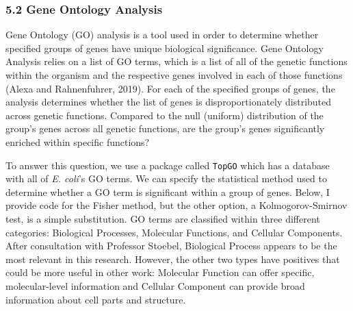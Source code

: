 \documentclass[]{article}
\begin{document}
\subsubsection{\texorpdfstring{\textbf{5.2} Gene Ontology
Analysis}{5.2 Gene Ontology Analysis}}\label{gene-ontology-analysis}

Gene Ontology (GO) analysis is a tool used in order to determine whether
specified groups of genes have unique biological significance. Gene
Ontology Analysis relies on a list of GO terms, which is a list of all
of the genetic functions within the organism and the respective genes
involved in each of those functions (Alexa and Rahnenfuhrer, 2019). For
each of the specified groups of genes, the analysis determines whether
the list of genes is disproportionately distributed across genetic
functions. Compared to the null (uniform) distribution of the group's
genes across all genetic functions, are the group's genes significantly
enriched within specific functions?

To answer this question, we use a package called \texttt{TopGO} which
has a database with all of \emph{E. coli}'s GO terms. We can specify the
statistical method used to determine whether a GO term is significant
within a group of genes. Below, I provide code for the Fisher method,
but the other option, a Kolmogorov-Smirnov test, is a simple
substitution. GO terms are classified within three different categories:
Biological Processes, Molecular Functions, and Cellular Components.
After consultation with Professor Stoebel, Biological Process appears to
be the most relevant in this research. However, the other two types have
positives that could be more useful in other work: Molecular Function
can offer specific, molecular-level information and Cellular Component
can provide broad information about cell parts and structure.
\end{document}
